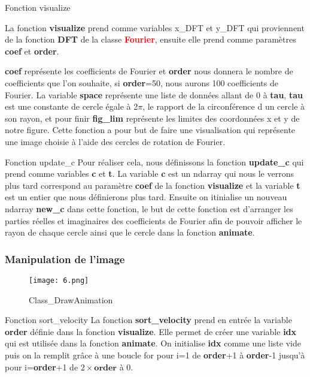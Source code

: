 \documentclass[aspectratio=169]{beamer}
\begin{document}
\begin{frame}{Fonction visualize}
    

La fonction \textbf{visualize} prend comme variables x\_DFT et y\_DFT qui proviennent de la fonction \textbf{DFT} de la classe \textcolor{red}{\textbf{Fourier}},  ensuite elle prend comme paramètres \textbf{coef} et \textbf{order}.

\textbf{coef} représente les coefficients de Fourier et \textbf{order} nous donnera le nombre de coefficients que l'on souhaite, si \textbf{order}=50, nous aurons 100 coefficients de Fourier.
La variable \textbf{space} représente une liste de données allant de 0 à \textbf{tau}, \textbf{tau} est une constante de cercle égale à 2$\pi$, le rapport de la circonférence d un cercle à son rayon, et pour finir \textbf{fig\_lim} représente les limites des coordonnées x et y de notre figure. 
\newline
Cette fonction a pour but de faire une visualisation qui représente une image choisie à l'aide des cercles de rotation de Fourier. 
\end{frame}
\begin{frame}{Fonction update\_c}
Pour réaliser cela, nous définissons la fonction \textbf{update\_c} qui prend comme variables \textbf{c} et \textbf{t}. La variable \textbf{c} est un ndarray qui nous le verrons plus tard correspond au paramètre \textbf{coef} de la fonction \textbf{visualize} et la variable \textbf{t} est un entier que nous définierons plus tard. Ensuite on itinialise un nouveau ndarray \textbf{new\_c} dans cette fonction, le but de cette fonction est d'arranger les parties réelles et imaginaires des coefficients de Fourier afin de pouvoir afficher le rayon de chaque cercle ainsi que le cercle dans la fonction \textbf{animate}.

\end{frame}

\begin{frame}
    
    \frametitle{Manipulation de l'image }
  \begin{figure}[htpb]
        \begin{center}
            \texttt{[image: 6.png]}
            \caption{Class\_DrawAnimation}
        \end{center}
    \end{figure}
    
\end{frame}

\begin{frame}{Fonction sort\_velocity}
La fonction \textbf{sort\_velocity} prend en entrée la variable \textbf{order} définie dans la fonction \textbf{visualize}. Elle permet de créer une variable \textbf{idx} qui est utilisée dans la fonction \textbf{animate}. On initialise \textbf{idx} comme une liste vide puis on la remplit grâce à une boucle for pour i=1 de \textbf{order}+1 à \textbf{order}-1 jusqu'à pour i=\textbf{order}+1 de $2\times \textbf{order}$ à 0.
    
\end{frame}
\end{document}
